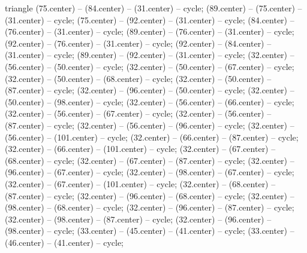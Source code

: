 \begin{pgfonlayer}{triangle}
 (75.center) -- (84.center) -- (31.center) -- cycle; 
 (89.center) -- (75.center) -- (31.center) -- cycle; 
 (75.center) -- (92.center) -- (31.center) -- cycle; 
 (84.center) -- (76.center) -- (31.center) -- cycle; 
 (89.center) -- (76.center) -- (31.center) -- cycle; 
 (92.center) -- (76.center) -- (31.center) -- cycle; 
 (92.center) -- (84.center) -- (31.center) -- cycle; 
 (89.center) -- (92.center) -- (31.center) -- cycle; 
 (32.center) -- (56.center) -- (50.center) -- cycle; 
 (32.center) -- (50.center) -- (67.center) -- cycle; 
 (32.center) -- (50.center) -- (68.center) -- cycle; 
 (32.center) -- (50.center) -- (87.center) -- cycle; 
 (32.center) -- (96.center) -- (50.center) -- cycle; 
 (32.center) -- (50.center) -- (98.center) -- cycle; 
 (32.center) -- (56.center) -- (66.center) -- cycle; 
 (32.center) -- (56.center) -- (67.center) -- cycle; 
 (32.center) -- (56.center) -- (87.center) -- cycle; 
 (32.center) -- (56.center) -- (96.center) -- cycle; 
 (32.center) -- (56.center) -- (101.center) -- cycle; 
 (32.center) -- (66.center) -- (87.center) -- cycle; 
 (32.center) -- (66.center) -- (101.center) -- cycle; 
 (32.center) -- (67.center) -- (68.center) -- cycle; 
 (32.center) -- (67.center) -- (87.center) -- cycle; 
 (32.center) -- (96.center) -- (67.center) -- cycle; 
 (32.center) -- (98.center) -- (67.center) -- cycle; 
 (32.center) -- (67.center) -- (101.center) -- cycle; 
 (32.center) -- (68.center) -- (87.center) -- cycle; 
 (32.center) -- (96.center) -- (68.center) -- cycle; 
 (32.center) -- (98.center) -- (68.center) -- cycle; 
 (32.center) -- (96.center) -- (87.center) -- cycle; 
 (32.center) -- (98.center) -- (87.center) -- cycle; 
 (32.center) -- (96.center) -- (98.center) -- cycle; 
 (33.center) -- (45.center) -- (41.center) -- cycle; 
 (33.center) -- (46.center) -- (41.center) -- cycle; 

\end{pgfonlayer}
